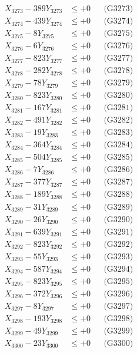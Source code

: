 \documentclass[a4paper,10pt]{article}
\begin{document}
{\begin{align}
X_{3273} - 389Y_{3273} &\leq +0 && \text{(G3273)} \\
X_{3274} - 439Y_{3274} &\leq +0 && \text{(G3274)} \\
X_{3275} - 8Y_{3275} &\leq +0 && \text{(G3275)} \\
X_{3276} - 6Y_{3276} &\leq +0 && \text{(G3276)} \\
X_{3277} - 823Y_{3277} &\leq +0 && \text{(G3277)} \\
X_{3278} - 282Y_{3278} &\leq +0 && \text{(G3278)} \\
X_{3279} - 78Y_{3279} &\leq +0 && \text{(G3279)} \\
X_{3280} - 823Y_{3280} &\leq +0 && \text{(G3280)} \\
\allowbreak
X_{3281} - 167Y_{3281} &\leq +0 && \text{(G3281)} \\
X_{3282} - 491Y_{3282} &\leq +0 && \text{(G3282)} \\
X_{3283} - 19Y_{3283} &\leq +0 && \text{(G3283)} \\
X_{3284} - 364Y_{3284} &\leq +0 && \text{(G3284)} \\
X_{3285} - 504Y_{3285} &\leq +0 && \text{(G3285)} \\
X_{3286} - 7Y_{3286} &\leq +0 && \text{(G3286)} \\
X_{3287} - 377Y_{3287} &\leq +0 && \text{(G3287)} \\
X_{3288} - 189Y_{3288} &\leq +0 && \text{(G3288)} \\
X_{3289} - 31Y_{3289} &\leq +0 && \text{(G3289)} \\
X_{3290} - 26Y_{3290} &\leq +0 && \text{(G3290)} \\
\allowbreak
X_{3291} - 639Y_{3291} &\leq +0 && \text{(G3291)} \\
X_{3292} - 823Y_{3292} &\leq +0 && \text{(G3292)} \\
X_{3293} - 55Y_{3293} &\leq +0 && \text{(G3293)} \\
X_{3294} - 587Y_{3294} &\leq +0 && \text{(G3294)} \\
X_{3295} - 823Y_{3295} &\leq +0 && \text{(G3295)} \\
X_{3296} - 372Y_{3296} &\leq +0 && \text{(G3296)} \\
X_{3297} - 8Y_{3297} &\leq +0 && \text{(G3297)} \\
X_{3298} - 193Y_{3298} &\leq +0 && \text{(G3298)} \\
X_{3299} - 49Y_{3299} &\leq +0 && \text{(G3299)} \\
X_{3300} - 23Y_{3300} &\leq +0 && \text{(G3300)} \\

\end{align}}
\end{document}
